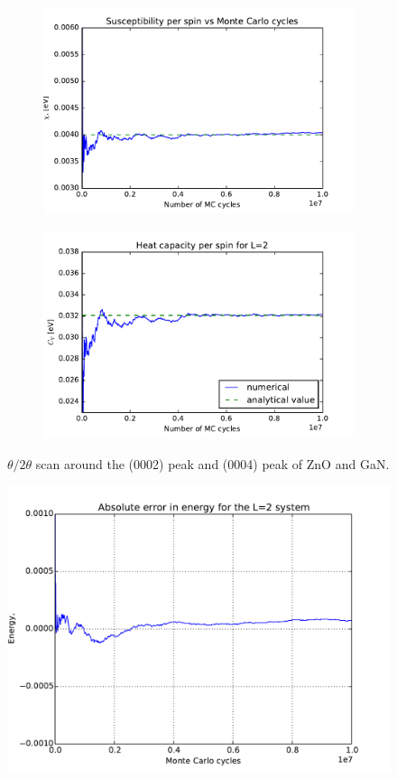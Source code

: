 	
	\begin{figure}[H]
		\begin{subfigure}[b]{0.49\textwidth}
	\includegraphics[width=1\linewidth]{../results/4b/L_2_susceptibility}
\caption{}
\label{fig:l2susceptibility}
		\end{subfigure}
		\hfill
		\begin{subfigure}[b]{0.49\textwidth}
		\includegraphics[width=1\linewidth]{../results/4b/L_2_heat_capasity}
\caption{}
\label{fig:l2heatcapasity}
		\end{subfigure}
		\caption{$\theta/2\theta$ scan around the (0002) peak and (0004) peak of ZnO and GaN.}
	\end{figure}

\begin{figure}[H]
	\centering
	\includegraphics[width=0.7\linewidth]{../results/4b/abs_error}
	\caption{}
	\label{fig:abserror}
\end{figure}


